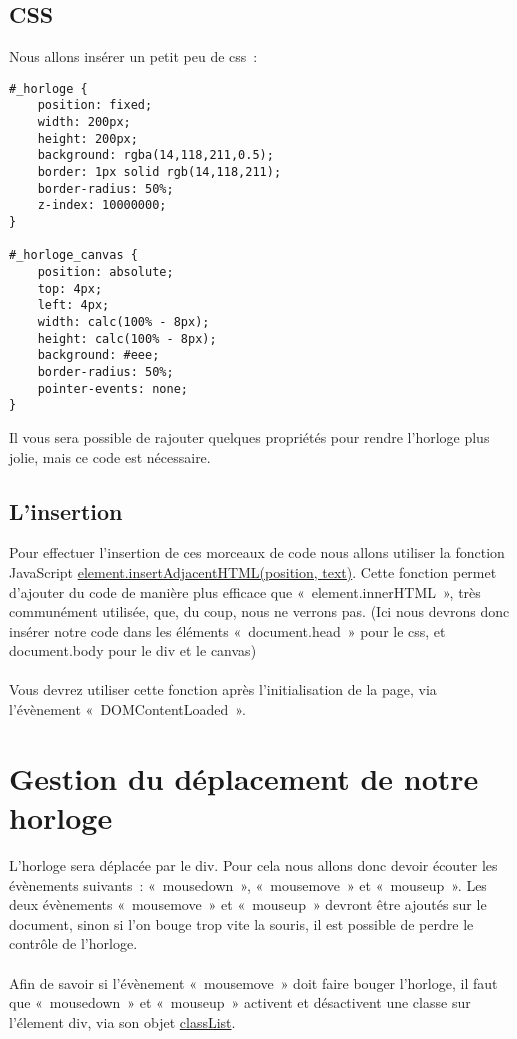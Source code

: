 \subsection{CSS}
Nous allons insérer un petit peu de css :
\begin{verbatim}
#_horloge {
    position: fixed;
    width: 200px;
    height: 200px;
    background: rgba(14,118,211,0.5);
    border: 1px solid rgb(14,118,211);
    border-radius: 50%;
    z-index: 10000000;
}

#_horloge_canvas {
    position: absolute;
    top: 4px;
    left: 4px;
    width: calc(100% - 8px);
    height: calc(100% - 8px);
    background: #eee;
    border-radius: 50%;
    pointer-events: none;
}
\end{verbatim}
Il vous sera possible de rajouter quelques propriétés pour rendre l’horloge plus
jolie, mais ce code est nécessaire.

\subsection{L’insertion}
Pour effectuer l’insertion de ces morceaux de code nous allons utiliser la
fonction JavaScript
\href{https://developer.mozilla.org/fr/docs/Web/API/Element/insertAdjacentHTML}{element.insertAdjacentHTML(position, text)}.
Cette fonction permet d’ajouter du code de manière plus efficace que
« element.innerHTML », très communément utilisée, que, du coup, nous ne verrons
pas. (Ici nous devrons donc insérer notre code dans les éléments
« document.head » pour le css, et document.body pour le div et le canvas)
\paragraph{}
Vous devrez utiliser cette fonction après l’initialisation de la page, via
l’évènement « DOMContentLoaded ».

\section{Gestion du déplacement de notre horloge}
L’horloge sera déplacée par le div. Pour cela nous allons donc devoir écouter
les évènements suivants : « mousedown », « mousemove » et « mouseup ». Les deux
évènements « mousemove » et « mouseup » devront être ajoutés sur le document,
sinon si l’on bouge trop vite la souris, il est possible de perdre le contrôle
de l’horloge.
\paragraph{}
Afin de savoir si l’évènement « mousemove » doit faire bouger l’horloge, il faut
que « mousedown » et « mouseup » activent et désactivent une classe sur
l’élement div, via son objet
\href{https://developer.mozilla.org/fr/docs/Web/API/Element/classList}{classList}.
